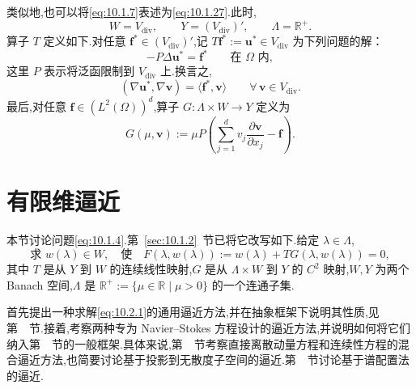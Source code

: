 类似地,也可以将\eqref{eq:10.1.7}表述为\eqref{eq:10.1.27}.此时,
\begin{equation}\label{eq:10.1.32}
  W=V_{\mathrm{div}},\qquad Y=(V_{\mathrm{div}})',\qquad \Lambda=\mathbb R^+.
\end{equation}
算子 \(T\) 定义如下.对任意 \(\boldsymbol{f}^*\in(V_{\mathrm{div}})'\),记 \(T\boldsymbol{f}^*:=\boldsymbol{u}^*\in V_{\mathrm{div}}\) 为下列问题的解：
\begin{equation}\label{eq:10.1.33}
  -P\Delta\boldsymbol{u}^*=\boldsymbol{f}^*\qquad\text{在 }\Omega\text{ 内},
\end{equation}
这里 \(P\) 表示将泛函限制到 \(V_{\mathrm{div}}\) 上.换言之,
\begin{equation}\label{eq:10.1.34}
  (\nabla\boldsymbol{u}^*,\nabla\boldsymbol{v})=\langle\boldsymbol{f}^*,\boldsymbol{v}\rangle
           \qquad\forall\,\boldsymbol{v}\in V_{\mathrm{div}}.
\end{equation}
最后,对任意 \(\boldsymbol{f}\in(L^2(\Omega))^d\),算子 \(G\colon\Lambda\times W\to Y\) 定义为
\begin{equation}\label{eq:10.1.35}
  G(\mu,\boldsymbol{v}):=\mu P\left(\sum_{j=1}^d v_j\frac{\partial\boldsymbol{v}}{\partial x_j}
                                         -\boldsymbol{f}\right).
\end{equation}

\section{有限维逼近}\label{sec:10.2}

本节讨论问题\eqref{eq:10.1.4}.第~\ref{sec:10.1.2}~节已将它改写如下.给定 \(\lambda\in\Lambda\),
\begin{equation}\label{eq:10.2.1}
  \text{求 }w(\lambda)\in W,\quad\text{使}\quad
    F(\lambda,w(\lambda)):=w(\lambda)+TG(\lambda,w(\lambda))=0,
\end{equation}
其中 \(T\) 是从 \(Y\) 到 \(W\) 的连续线性映射,\(G\) 是从 \(\Lambda\times W\) 到 \(Y\) 的 \(C^2\) 映射,\(W,Y\) 为两个 Banach 空间,\(\Lambda\) 是 \(\mathbb R^+:=\{\mu\in\mathbb R\mid\mu>0\}\) 的一个连通子集.

首先提出一种求解\eqref{eq:10.2.1}的通用逼近方法,并在抽象框架下说明其性质,见第~~节.接着,考察两种专为 Navier--Stokes 方程设计的逼近方法,并说明如何将它们纳入第~~节的一般框架.具体来说,第~~节考察直接离散动量方程和连续性方程的混合逼近方法,也简要讨论基于投影到无散度子空间的逼近.第~~节讨论基于谱配置法的逼近.

